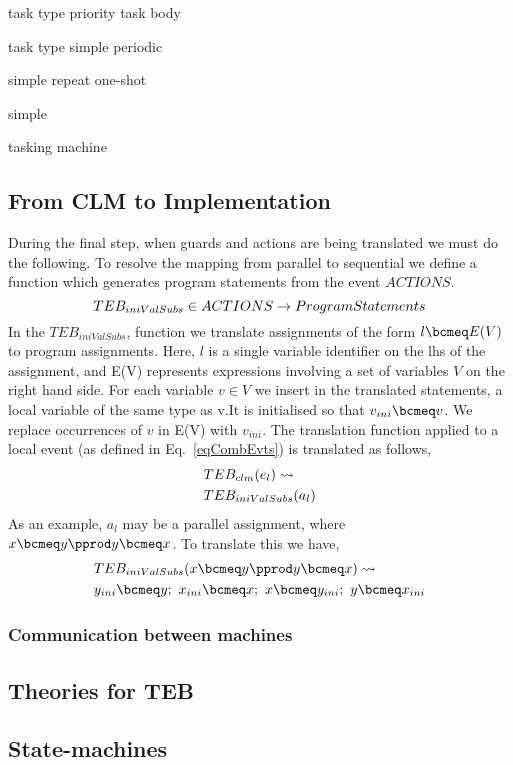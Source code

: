  
task type
priority
task body

task type
simple
periodic

simple
repeat
one-shot

simple

tasking machine


\subsection{From CLM to Implementation}
During the final step, when guards and actions are being translated we must do the following. To resolve the mapping from parallel to sequential we define a function which generates program statements from the event $ACTIONS$. 
\begin{equation}
TEB_{iniValSubs} \in  ACTIONS \rightarrow ProgramStatements
\notag
\end{equation}
In the $TEB_{iniValSubs}$, function we translate assignments of the form $l \bcmeq E(V)$ to program assignments. Here, $l$ is a single variable identifier on the lhs of the assignment, and  E(V) represents expressions involving a set of variables $V$ on the right hand side. For each variable $v \in V$ we insert in the translated statements, a local variable of the same type as v.It is initialised so that $v_{ini} \bcmeq v$. We replace occurrences of $v$ in E(V) with $v_{ini}$. The translation function applied to a local event (as defined in Eq.~\ref{eqCombEvts}) is translated as follows,
%
\begin{equation}
\begin{split}
&TEB_{clm}(e_l) \leadsto \\
&TEB_{iniValSubs}(a_l)
\end{split}
\notag
\end{equation}
%
As an example, $a_l$ may be a parallel assignment, where $x \bcmeq y \pprod y \bcmeq x$. To translate this we have,
%
\begin{equation}
\begin{split}
&TEB_{iniValSubs}(x \bcmeq y \pprod y \bcmeq x) \leadsto\\
&y_{ini} \bcmeq y;~ x_{ini} \bcmeq x;~ x \bcmeq y_{ini};~ y \bcmeq x_{ini}  
\end{split}
\notag
\end{equation}



\subsubsection{Communication between machines}\label{synching}


\subsection{Theories for TEB}

\subsection{State-machines}